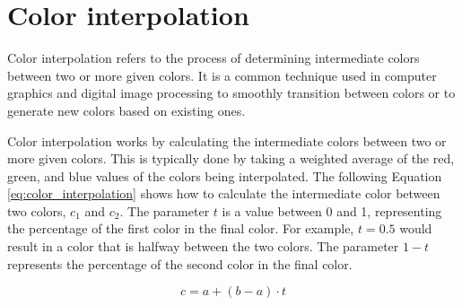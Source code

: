 \documentclass[
  digital,     %
  oneside,     %
  nosansbold,  %
  nocolorbold, %
  lof,         %
  lot,         %
]{fithesis4}
\begin{document}






\section {Color interpolation}
\label{section:color_interpolation}

Color interpolation refers to the process of determining intermediate colors between two or more given colors. It is a common technique used in computer graphics and digital image processing to smoothly transition between colors or to generate new colors based on existing ones. \cite{zucconi2016secrets}

Color interpolation works by calculating the intermediate colors between two or more given colors. This is typically done by taking a weighted average of the red, green, and blue values of the colors being interpolated. The following Equation \ref{eq:color_interpolation} shows how to calculate the intermediate color between two colors, $c_1$ and $c_2$. The parameter $t$ is a value between 0 and 1, representing the percentage of the first color in the final color. For example, $t = 0.5$ would result in a color that is halfway between the two colors. The parameter $1 - t$ represents the percentage of the second color in the final color.

\begin{equation}
  c = a + (b - a) \cdot t
\end{equation}
\label{eq:color_interpolation}
\end{document}
